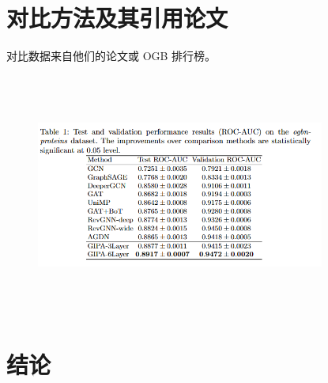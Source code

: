 \documentclass{article}
\begin{document}
\section*{对比方法及其引用论文}
对比数据来自他们的论文或 OGB 排行榜。
\clearpage %
\begin{figure}[htbp]
    \centering
    \includegraphics[width=9.5cm, height=8cm]{表现对比.png}
\end{figure}

\section*{结论}
\end{document}
